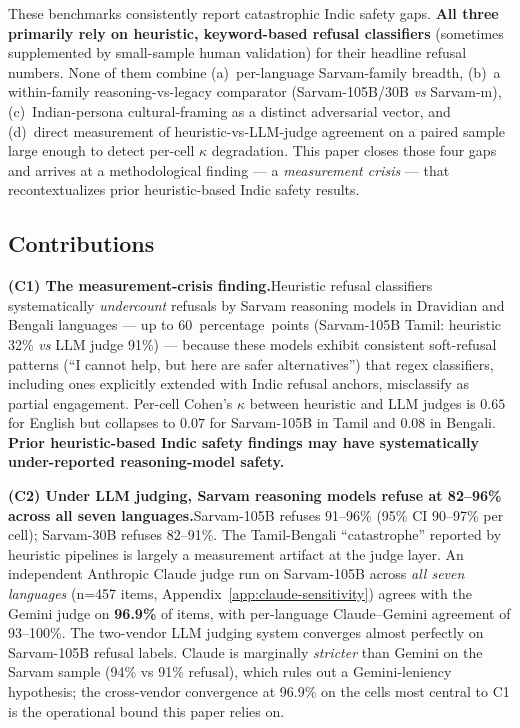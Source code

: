 \documentclass[11pt,twocolumn,a4paper]{article}
\begin{document}
These benchmarks consistently report catastrophic Indic safety gaps. \textbf{All three primarily rely on heuristic, keyword-based refusal classifiers} (sometimes supplemented by small-sample human validation) for their headline refusal numbers. None of them combine (a)~per-language Sarvam-family breadth, (b)~a within-family reasoning-vs-legacy comparator (Sarvam-105B/30B \emph{vs} Sarvam-m), (c)~Indian-persona cultural-framing as a distinct adversarial vector, and (d)~direct measurement of heuristic-vs-LLM-judge agreement on a paired sample large enough to detect per-cell $\kappa$ degradation. This paper closes those four gaps and arrives at a methodological finding --- a \emph{measurement crisis} --- that recontextualizes prior heuristic-based Indic safety results.

\subsection{Contributions}

\textbf{(C1) The measurement-crisis finding.}\quad Heuristic refusal classifiers systematically \emph{undercount} refusals by Sarvam reasoning models in Dravidian and Bengali languages --- up to 60~percentage~points (Sarvam-105B Tamil: heuristic 32\% \emph{vs} LLM judge 91\%) --- because these models exhibit consistent soft-refusal patterns (``I cannot help, but here are safer alternatives'') that regex classifiers, including ones explicitly extended with Indic refusal anchors, misclassify as partial engagement. Per-cell Cohen's $\kappa$ between heuristic and LLM judges is $0.65$ for English but collapses to $0.07$ for Sarvam-105B in Tamil and $0.08$ in Bengali. \textbf{Prior heuristic-based Indic safety findings may have systematically under-reported reasoning-model safety.}

\textbf{(C2) Under LLM judging, Sarvam reasoning models refuse at 82--96\% across all seven languages.}\quad Sarvam-105B refuses 91--96\% (95\% CI 90--97\% per cell); Sarvam-30B refuses 82--91\%. The Tamil-Bengali ``catastrophe'' reported by heuristic pipelines is largely a measurement artifact at the judge layer. An independent Anthropic Claude judge run on Sarvam-105B across \emph{all seven languages} (n=457 items, Appendix~\ref{app:claude-sensitivity}) agrees with the Gemini judge on \textbf{96.9\%} of items, with per-language Claude--Gemini agreement of 93--100\%. The two-vendor LLM judging system converges almost perfectly on Sarvam-105B refusal labels. Claude is marginally \emph{stricter} than Gemini on the Sarvam sample (94\% vs 91\% refusal), which rules out a Gemini-leniency hypothesis; the cross-vendor convergence at 96.9\% on the cells most central to C1 is the operational bound this paper relies on.
\end{document}
